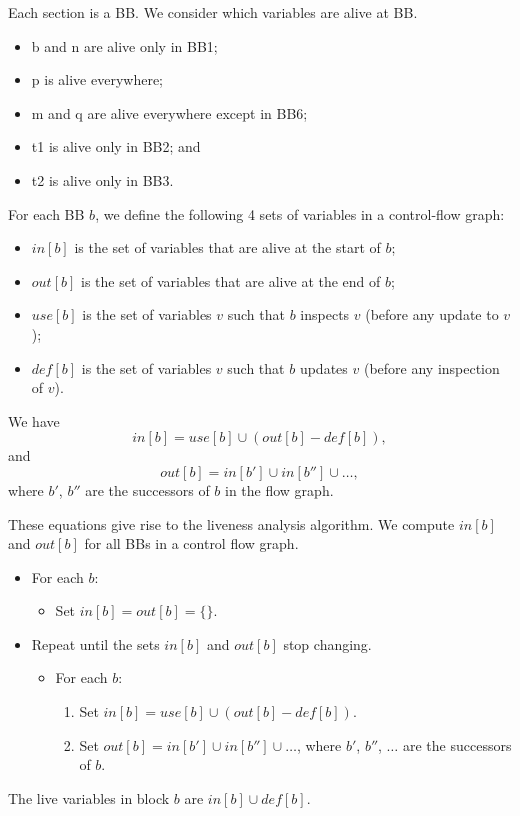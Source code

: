 \documentclass[a4paper, openany]{memoir}
\begin{document}
Each section is a BB. We consider which variables are alive at BB.
\begin{itemize}
    \item b and n are alive only in BB1;
    \item p is alive everywhere;
    \item m and q are alive everywhere except in BB6;
    \item t1 is alive only in BB2; and
    \item t2 is alive only in BB3.
\end{itemize}

For each BB $b$, we define the following 4 sets of variables in a control-flow graph:
\begin{itemize}
    \item $in[b]$ is the set of variables that are alive at the start of $b$;
    \item $out[b]$ is the set of variables that are alive at the end of $b$;
    \item $use[b]$ is the set of variables $v$ such that $b$ inspects $v$ (before any update to $v$);
    \item $def[b]$ is the set of variables $v$ such that $b$ updates $v$ (before any inspection of $v$).
\end{itemize}
We have
\[in[b] = use[b] \cup (out[b] - def[b]),\]
and
\[out[b] = in[b'] \cup in[b''] \cup \dots,\]
where $b'$, $b''$ are the successors of $b$ in the flow graph.

These equations give rise to the liveness analysis algorithm. We compute $in[b]$ and $out[b]$ for all BBs in a control flow graph.
\begin{itemize}
    \item For each $b$:
    \begin{itemize}
        \item Set $in[b] = out[b] = \{\}$.
    \end{itemize}
    \item Repeat until the sets $in[b]$ and $out[b]$ stop changing.
    \begin{itemize}
        \item For each $b$:
        \begin{enumerate}
            \item Set $in[b] = use[b] \cup (out[b] - def[b])$.
            \item Set $out[b] = in[b'] \cup in[b''] \cup \dots$, where $b'$, $b''$, $\dots$ are the successors of $b$.
        \end{enumerate}
    \end{itemize}
\end{itemize}
The live variables in block $b$ are $in[b] \cup def[b]$.
\end{document}
